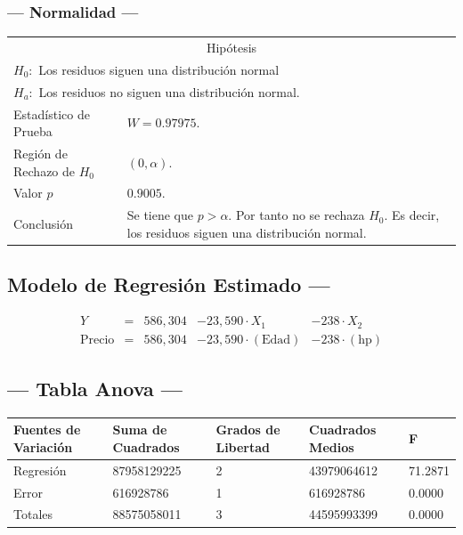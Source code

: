 \subsubsection{--- Normalidad ---} %
\begin{center}
  \begin{tabular}{|l|p{8cm}|}
    \cline{1-2}
    \multicolumn{2}{|c|}{Hipótesis}\\ \cline{1-2}
    \multicolumn{2}{|l|}{\(H_0:\) Los residuos siguen una distribución normal} \\ 
    \multicolumn{2}{|l|}{\(H_a:\) Los residuos no siguen una distribución normal.} \\ \cline{1-2}
    Estadístico de Prueba & \(W = 0.97975\).\\ \cline{1-2} 
		Región de Rechazo de \(H_0\) & \((0, \alpha )\).\\ \cline{1-2} 
    Valor \(p\) & \(0.9005\).\\ \cline{1-2} 
    Conclusión & Se tiene que \(p> \alpha\). \newline 
		Por tanto no se rechaza \(H_0\). \newline 
		Es decir, los residuos siguen una distribución normal.\\ \cline{1-2} 
  \end{tabular}
\end{center}


\subsection{\centering Modelo de Regresión Estimado ---} %
\begin{align}
	Y & = &              586,304 & - 23,590 \cdot X_1           & - 238     \cdot X_2   \\[2mm]
	\mbox{Precio} & = &  586,304 & - 23,590 \cdot (\mbox{Edad}) & - 238     \cdot (\mbox{hp})
	\label{eq:6}
\end{align}

\subsection{\centering --- Tabla Anova ---} %
\begin{center}
  \begin{tabular}{|l|l|l|l|l|}
    \hline 
    Fuentes de Variación  & Suma de Cuadrados & Grados de Libertad & Cuadrados Medios & F\\ \hline 
Regresión  &  87958129225          &  2      & 43979064612 & 71.2871\\ \hline
Error      &    616928786          &  1      &   616928786 &  0.0000\\ \hline
Totales    &  88575058011          &  3      & 44595993399 &  0.0000\\ \hline
  \end{tabular}
\end{center} 

